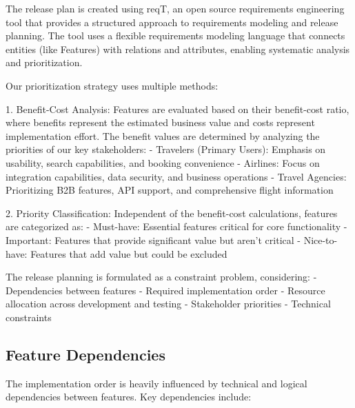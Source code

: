 The release plan is created using reqT, an open source requirements engineering tool that provides a structured approach to requirements modeling and release planning. The tool uses a flexible requirements modeling language that connects entities (like Features) with relations and attributes, enabling systematic analysis and prioritization.

Our prioritization strategy uses multiple methods:

1. Benefit-Cost Analysis: Features are evaluated based on their benefit-cost ratio, where benefits represent the estimated business value and costs represent implementation effort. The benefit values are determined by analyzing the priorities of our key stakeholders:
   - Travelers (Primary Users): Emphasis on usability, search capabilities, and booking convenience
   - Airlines: Focus on integration capabilities, data security, and business operations
   - Travel Agencies: Prioritizing B2B features, API support, and comprehensive flight information

2. Priority Classification: Independent of the benefit-cost calculations, features are categorized as:
   - Must-have: Essential features critical for core functionality
   - Important: Features that provide significant value but aren't critical
   - Nice-to-have: Features that add value but could be excluded

The release planning is formulated as a constraint problem, considering:
- Dependencies between features
- Required implementation order
- Resource allocation across development and testing
- Stakeholder priorities
- Technical constraints

\subsection{Feature Dependencies}
The implementation order is heavily influenced by technical and logical dependencies between features. Key dependencies include:

